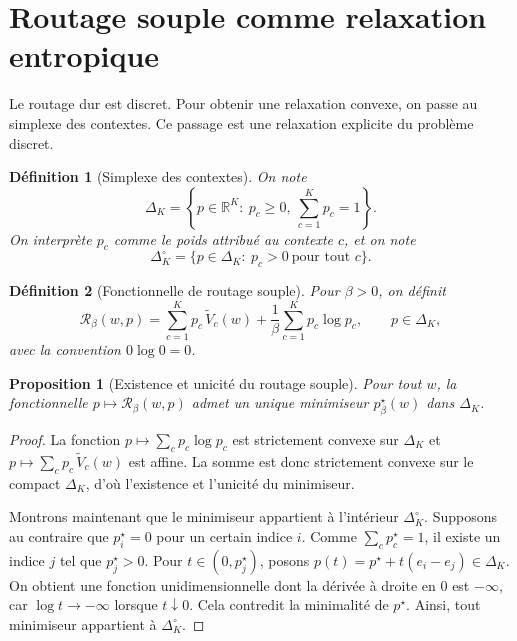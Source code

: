 \documentclass[11pt,a4paper]{article}
\newtheorem{definition}{Définition}[section]
\newtheorem{proposition}{Proposition}[section]
\newcommand{\R}{\mathbb R}
\newcommand{\Rcal}{\mathcal R}
\begin{document}
\section{Routage souple comme relaxation entropique}

Le routage dur est discret. Pour obtenir une relaxation convexe, on passe au simplexe des contextes. Ce passage est une relaxation explicite du problème discret.

\begin{definition}[Simplexe des contextes]
On note
\[
\Delta_K
=
\left\{
 p\in\R^K:\ p_c\ge 0,\ \sum_{c=1}^K p_c=1
\right\}.
\]
On interprète \(p_c\) comme le poids attribué au contexte \(c\), et on note
\[
\Delta_K^\circ=
\{p\in\Delta_K:\ p_c>0\ \text{pour tout }c\}.
\]
\end{definition}

\begin{definition}[Fonctionnelle de routage souple]
Pour \(\beta>0\), on définit
\[
\Rcal_\beta(w,p)
=
\sum_{c=1}^K p_c\,\widetilde V_c(w)
+
\frac{1}{\beta}\sum_{c=1}^K p_c\log p_c,
\qquad p\in\Delta_K,
\]
avec la convention \(0\log 0=0\).
\end{definition}

\begin{proposition}[Existence et unicité du routage souple]
Pour tout \(w\), la fonctionnelle \(p\mapsto \Rcal_\beta(w,p)\) admet un unique minimiseur \(p^\star_\beta(w)\) dans \(\Delta_K\).
\end{proposition}

\begin{proof}
La fonction \(p\mapsto \sum_c p_c\log p_c\) est strictement convexe sur \(\Delta_K\) et \(p\mapsto \sum_c p_c\,\widetilde V_c(w)\) est affine. La somme est donc strictement convexe sur le compact \(\Delta_K\), d'où l'existence et l'unicité du minimiseur.

Montrons maintenant que le minimiseur appartient à l'intérieur \(\Delta_K^\circ\). Supposons au contraire que \(p^\star_i=0\) pour un certain indice \(i\). Comme \(\sum_c p^\star_c=1\), il existe un indice \(j\) tel que \(p^\star_j>0\). Pour \(t\in(0,p^\star_j)\), posons \(p(t)=p^\star+t(e_i-e_j)\in\Delta_K\). On obtient une fonction unidimensionnelle dont la dérivée à droite en 0 est \(-\infty\), car \(\log t\to-\infty\) lorsque \(t\downarrow0\). Cela contredit la minimalité de \(p^\star\). Ainsi, tout minimiseur appartient à \(\Delta_K^\circ\).
\end{proof}
\end{document}
